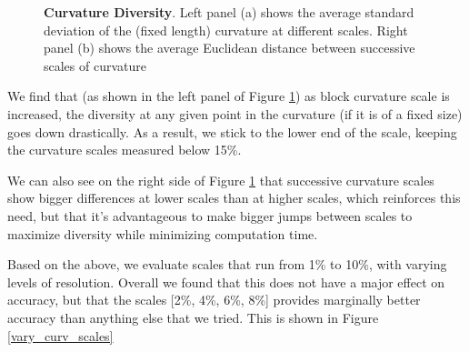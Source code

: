 \begin{figure}[t]%
	\centering
	\caption{\textbf{Curvature Diversity}. Left panel (a) shows the average standard deviation of the (fixed length) curvature at different scales. Right panel (b) shows the average Euclidean distance between successive scales of curvature}
    	\label{fig:curvature_diversity}
\end{figure}


We find that (as shown in the left panel of Figure \ref{fig:curvature_diversity}) as block curvature scale is increased, the diversity at any given point in the curvature (if it is of a fixed size) goes down drastically. 
As a result, we stick to the lower end of the scale, keeping the curvature scales measured below 15\%.

We can also see on the right side of Figure \ref{fig:curvature_diversity} that successive curvature scales show bigger differences at lower scales than at higher scales, which reinforces this need, but that it's advantageous to make bigger jumps between scales to maximize diversity while minimizing computation time.

Based on the above, we evaluate scales that run from 1\% to 10\%, with varying levels of resolution.
Overall we found that this does not have a major effect on accuracy, but that the scales [2\%, 4\%, 6\%, 8\%] provides marginally better accuracy than anything else that we tried.
This is shown in Figure \ref{vary_curv_scales}

